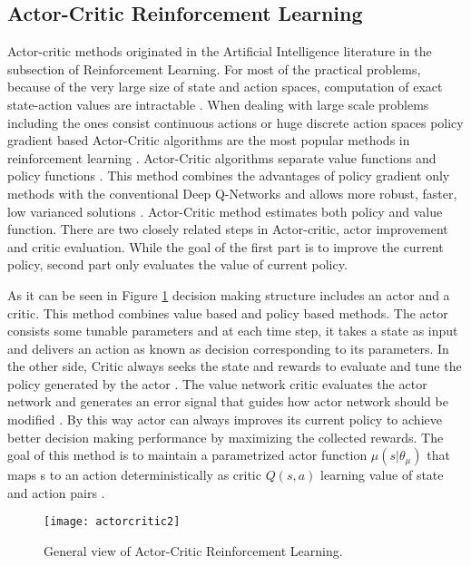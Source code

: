 \documentclass{ituphdreport}
\begin{document}
\subsection{Actor-Critic Reinforcement Learning} \label{sec:actorcriticrl}
Actor-critic methods originated in the Artificial Intelligence literature in the subsection of Reinforcement Learning. For most of the practical problems, because of the very large size of state and action spaces, computation of exact state-action values are intractable \cite{Vijaymohan2002}. When dealing with large scale problems including the ones consist continuous actions or huge discrete action spaces policy gradient based Actor-Critic algorithms are the most popular methods in reinforcement learning \cite{grondman2012survey}. Actor-Critic algorithms separate value functions and policy functions \cite{mnih2016asynchronous}. This method combines the advantages of policy gradient only methods with the conventional Deep Q-Networks and allows more robust, faster, low varianced solutions \cite{grondman2012survey}. Actor-Critic method estimates both policy and value function. There are two closely related steps in Actor-critic, actor improvement and critic evaluation. While the goal of the first part is to improve the current policy, second part only evaluates the value of current policy. 

As it can be seen in Figure \ref{fig:actorcritic} decision making structure includes an actor and a critic. This method combines value based and policy based methods. The actor consists some tunable parameters and at each time step, it takes a state as input and delivers an action as known as decision corresponding to its parameters. In the other side, Critic always seeks the state and rewards to evaluate and tune the policy generated by the actor \cite{Vijaymohan2002}. The value network critic evaluates the actor network and generates an error signal that guides how actor network should be modified \cite{lillicrap2015continuous}. By this way actor can always improves its current policy to achieve better decision making performance by maximizing the collected rewards. The goal of this method is to maintain a parametrized actor function $\mu(s|\theta_\mu)$ that maps s to an action deterministically as critic $Q(s,a)$ learning value of state and action pairs \cite{lillicrap2015continuous}.

\begin{figure}[h]
	\begin{center}
		\texttt{[image: actorcritic2]}
	\end{center}
	\caption{General view of Actor-Critic Reinforcement Learning.
		\label{fig:actorcritic}}
\end{figure}
\end{document}
